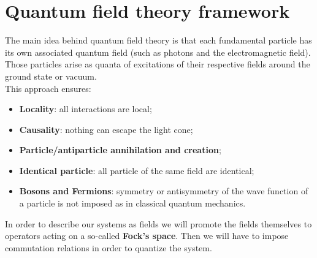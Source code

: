 \section{Quantum field theory framework}
The main idea behind quantum field theory is that each fundamental particle has its own associated quantum field (such as photons and the electromagnetic field). Those particles arise as quanta of excitations of their respective fields around the ground state or vacuum.\\This approach ensures:
\begin{itemize}
    \item \textbf{Locality}: all interactions are local;
    \item \textbf{Causality}: nothing can escape the light cone;
    \item \textbf{Particle/antiparticle annihilation and creation};
    \item \textbf{Identical particle}: all particle of the same field are identical;
    \item \textbf{Bosons and Fermions}: symmetry or antisymmetry of the wave function of a particle is not imposed as in classical quantum mechanics.
\end{itemize}
In order to describe our systems as fields we will promote the fields themselves to operators acting on a so-called \textbf{Fock's space}. Then we will have to impose commutation relations in order to quantize the system.
